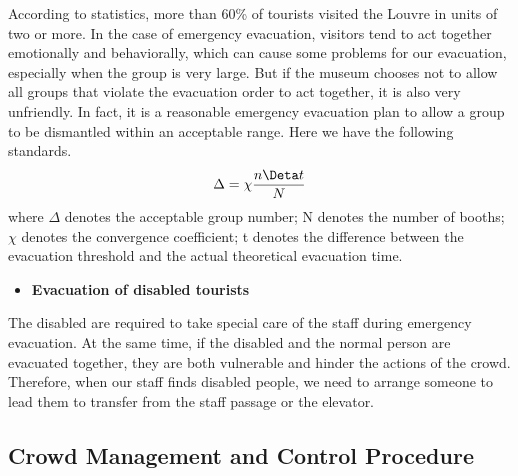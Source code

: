 According to statistics, more than 60\% of tourists visited the Louvre in units of two or more. In the case of emergency evacuation, visitors tend to act together emotionally and behaviorally, which can cause some problems for our evacuation, especially when the group is very large. But if the museum chooses not to allow all groups that violate the evacuation order to act together, it is also very unfriendly. In fact, it is a reasonable emergency evacuation plan to allow a group to be dismantled within an acceptable range. Here we have the following standards.
 \[
 \Delta=\chi\frac{n \Deta t}{N}
 \]
where $\Delta$ denotes the acceptable group number; N denotes the number of booths; $\chi$ denotes the convergence coefficient; t denotes the difference between the evacuation threshold and the actual theoretical evacuation time.
 
 \begin{itemize}
    \item \textbf{Evacuation of disabled tourists}
\end{itemize}
 
The disabled are required to take special care of the staff during emergency evacuation. At the same time, if the disabled and the normal person are evacuated together, they are both vulnerable and hinder the actions of the crowd. Therefore, when our staff finds disabled people, we need to arrange someone to lead them to transfer from the staff passage or the elevator.
 
\subsection{Crowd Management and Control Procedure}

